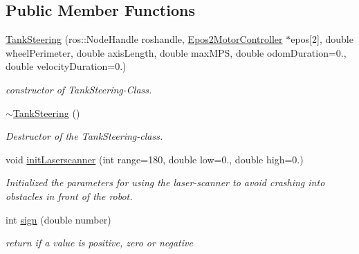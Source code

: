\subsection*{Public Member Functions}
\begin{DoxyCompactItemize}
\item 
\hyperlink{classTankSteering_ad7e373315c8b6b1993a67ff269dd4817}{Tank\-Steering} (ros\-::\-Node\-Handle roshandle, \hyperlink{classEpos2MotorController}{Epos2\-Motor\-Controller} $\ast$epos\mbox{[}2\mbox{]}, double wheel\-Perimeter, double axis\-Length, double max\-M\-P\-S, double odom\-Duration=0., double velocity\-Duration=0.)
\begin{DoxyCompactList}\small\item\em constructor of Tank\-Steering-\/\-Class. \end{DoxyCompactList}\item 
\hyperlink{classTankSteering_a598a4efa2896aa382ed7fe9af6e22519}{$\sim$\-Tank\-Steering} ()
\begin{DoxyCompactList}\small\item\em Destructor of the Tank\-Steering-\/class. \end{DoxyCompactList}\item 
void \hyperlink{classTankSteering_ac07cb26cfc52f615863d6fdaef924131}{init\-Laserscanner} (int range=180, double low=0., double high=0.)
\begin{DoxyCompactList}\small\item\em Initialized the parameters for using the laser-\/scanner to avoid crashing into obstacles in front of the robot. \end{DoxyCompactList}\item 
int \hyperlink{classTankSteering_a89990f8796af8d4224752c0e0a0daf47}{sign} (double number)
\begin{DoxyCompactList}\small\item\em return if a value is positive, zero or negative \end{DoxyCompactList}\end{DoxyCompactItemize}
